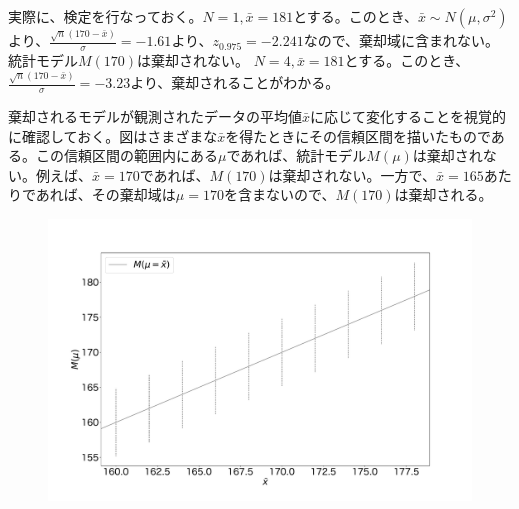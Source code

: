 実際に、検定を行なっておく。$N=1,\bar{x}=181$とする。このとき、$\bar{x}\sim N(\mu,\sigma^2)$より、$\frac{\sqrt{n}(170-\bar{x})}{\sigma}=-1.61$より、$z_{0.975}=-2.241$なので、棄却域に含まれない。統計モデル$M(170)$は棄却されない。
$N=4,\bar{x}=181$とする。このとき、$\frac{\sqrt{n}(170-\bar{x})}{\sigma}=-3.23$より、棄却されることがわかる。

棄却されるモデルが観測されたデータの平均値$\bar{x}$に応じて変化することを視覚的に確認しておく。図はさまざまな$\bar{x}$を得たときにその信頼区間を描いたものである。この信頼区間の範囲内にある$\mu$であれば、統計モデル$M(\mu)$は棄却されない。例えば、$\bar{x}=170$であれば、$M(170)$は棄却されない。一方で、$\bar{x}=165$あたりであれば、その棄却域は$\mu=170$を含まないので、$M(170)$は棄却される。

\begin{figure}
\begin{center}
    \includegraphics[width=15cm]{./image/04_/confidence_interval_model.pdf}
  \end{center}
\end{figure}




